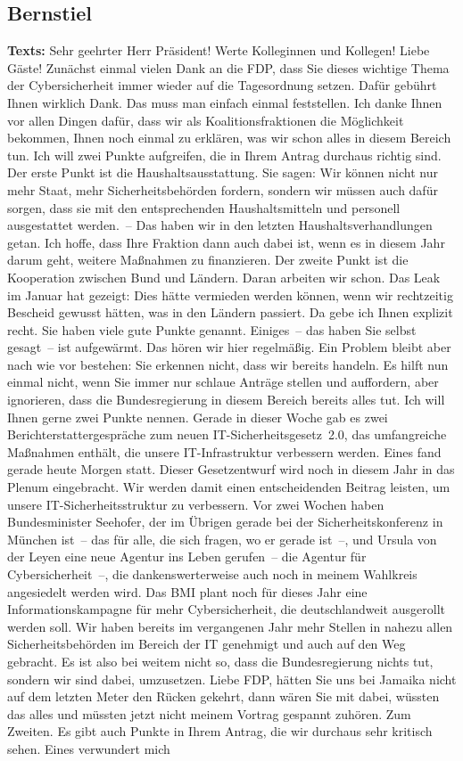 \documentclass{article}
\begin{document}
\subsection{Bernstiel}
\noindent\textbf{Texts:} Sehr geehrter Herr Präsident! Werte Kolleginnen und Kollegen! Liebe Gäste! Zunächst einmal vielen Dank an die FDP, dass Sie dieses wichtige Thema der Cybersicherheit immer wieder auf die Tagesordnung setzen.  Dafür gebührt Ihnen wirklich Dank. Das muss man einfach einmal feststellen. Ich danke Ihnen vor allen Dingen dafür, dass wir als Koalitionsfraktionen die Möglichkeit bekommen, Ihnen noch einmal zu erklären, was wir schon alles in diesem Bereich tun.  Ich will zwei Punkte aufgreifen, die in Ihrem Antrag durchaus richtig sind. Der erste Punkt ist die Haushaltsausstattung. Sie sagen: Wir können nicht nur mehr Staat, mehr Sicherheitsbehörden fordern, sondern wir müssen auch dafür sorgen, dass sie mit den entsprechenden Haushaltsmitteln und personell ausgestattet werden. – Das haben wir in den letzten Haushaltsverhandlungen getan. Ich hoffe, dass Ihre Fraktion dann auch dabei ist, wenn es in diesem Jahr darum geht, weitere Maßnahmen zu finanzieren. Der zweite Punkt ist die Kooperation zwischen Bund und Ländern. Daran arbeiten wir schon. Das Leak im Januar hat gezeigt: Dies hätte vermieden werden können, wenn wir rechtzeitig Bescheid gewusst hätten, was in den Ländern passiert. Da gebe ich Ihnen explizit recht. Sie haben viele gute Punkte genannt. Einiges – das haben Sie selbst gesagt – ist aufgewärmt. Das hören wir hier regelmäßig. Ein Problem bleibt aber nach wie vor bestehen: Sie erkennen nicht, dass wir bereits handeln. Es hilft nun einmal nicht, wenn Sie immer nur schlaue Anträge stellen und auffordern, aber ignorieren, dass die Bundesregierung in diesem Bereich bereits alles tut.  Ich will Ihnen gerne zwei Punkte nennen. Gerade in dieser Woche gab es zwei Berichterstattergespräche zum neuen IT-Sicherheitsgesetz 2.0, das umfangreiche Maßnahmen enthält, die unsere IT-Infrastruktur verbessern werden. Eines fand gerade heute Morgen statt. Dieser Gesetzentwurf wird noch in diesem Jahr in das Plenum eingebracht. Wir werden damit einen entscheidenden Beitrag leisten, um unsere IT-Sicherheitsstruktur zu verbessern. Vor zwei Wochen haben Bundesminister Seehofer, der im Übrigen gerade bei der Sicherheitskonferenz in München ist – das für alle, die sich fragen, wo er gerade ist –, und Ursula von der Leyen eine neue Agentur ins Leben gerufen – die Agentur für Cybersicherheit –, die dankenswerterweise auch noch in meinem Wahlkreis angesiedelt werden wird.  Das BMI plant noch für dieses Jahr eine Informationskampagne für mehr Cybersicherheit, die deutschlandweit ausgerollt werden soll. Wir haben bereits im vergangenen Jahr mehr Stellen in nahezu allen Sicherheitsbehörden im Bereich der IT genehmigt und auch auf den Weg gebracht. Es ist also bei weitem nicht so, dass die Bundesregierung nichts tut, sondern wir sind dabei, umzusetzen. Liebe FDP, hätten Sie uns bei Jamaika nicht auf dem letzten Meter den Rücken gekehrt, dann wären Sie mit dabei, wüssten das alles und müssten jetzt nicht meinem Vortrag gespannt zuhören.  Zum Zweiten. Es gibt auch Punkte in Ihrem Antrag, die wir durchaus sehr kritisch sehen. Eines verwundert mich 
\end{document}
